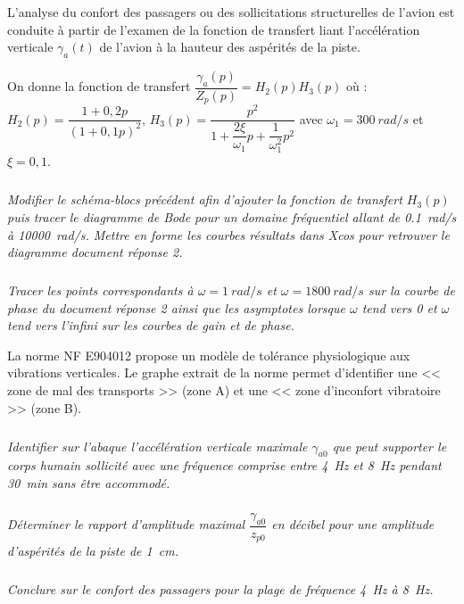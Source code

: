 \documentclass[10pt,fleqn]{article} %
\begin{document}
\begin{multicols}{2}
L'analyse du confort des passagers ou des sollicitations structurelles de l'avion 
est conduite à partir de l'examen 
de la fonction de transfert liant 
l'accélération verticale $\gamma_a(t)$
de l'avion à la hauteur des aspérités de la piste.


On donne la fonction de transfert $\dfrac{\gamma_a(p)}{Z_p(p)}=H_2(p) H_3(p)$ où : $H_2(p)=\dfrac{1+0,2 p}{\left(1+0,1 p \right)^2}$, $H_3(p)=\dfrac{p^2}{1+\dfrac{2\xi}{\omega_1}p+\dfrac{1}{\omega_1^2}p^2}$ avec $\omega_1=\SI{300}{rad/s}$ et $\xi=0,1$. 



\subparagraph{}
\textit{Modifier le schéma-blocs
précédent afin d’ajouter la fonction de transfert $H_3(p)$ puis tracer le diagramme
de Bode pour un domaine fréquentiel allant de \SI{0,1}{rad/s} à \SI{10000}{rad/s}. Mettre en forme les courbes résultats
dans Xcos pour retrouver le diagramme document réponse 2.}
\ifprof
\begin{corrige}
\end{corrige}
\else
\fi


\subparagraph{}
\textit{Tracer les points correspondants à $\omega=\SI{1}{rad/s}$ et $\omega=\SI{1800}{rad/s}$ sur la courbe de phase du document réponse 2 ainsi que les asymptotes lorsque $\omega$ tend vers 0 et $\omega$ tend vers l'infini sur les courbes de gain et de phase.}
\ifprof
\begin{corrige}
\end{corrige}
\else
\fi


La norme NF E904012 propose un modèle de tolérance physiologique aux vibrations verticales. Le graphe extrait de la norme permet d’identifier une << zone de mal des transports >> (zone A) et une << zone d’inconfort vibratoire >> (zone B).

\subparagraph{}
\textit{Identifier sur l’abaque l’accélération 
verticale maximale $\gamma_{a0}$
que peut supporter le corps humain 
sollicité avec une fréquence comprise 
entre \SI{4}{Hz} et \SI{8}{Hz} 
pendant \SI{30}{min} sans être accommodé.
}
\ifprof
\begin{corrige}
\end{corrige}
\else
\fi


\subparagraph{}
\textit{Déterminer le rapport d’amplitude maximal $\dfrac{\gamma_{a0}}{z_{p0}}$
en décibel pour une amplitude d’aspérités de la piste de \SI{1}{cm}.}
\ifprof
\begin{corrige}
\end{corrige}
\else
\fi


\subparagraph{}
\textit{Conclure sur le confort des passagers pour la plage de fréquence \SI{4}{Hz} à \SI{8}{Hz}.}
\ifprof
\begin{corrige}
\end{corrige}
\else
\fi



\end{multicols}
\end{document}
